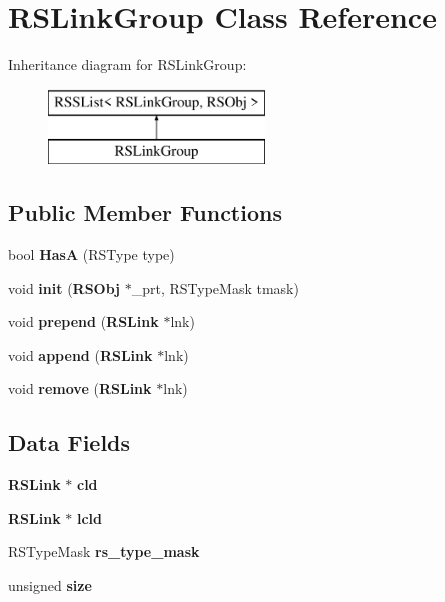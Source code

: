 \section{R\-S\-Link\-Group Class Reference}
\label{classRSLinkGroup}
Inheritance diagram for R\-S\-Link\-Group\-:\begin{figure}[H]
\begin{center}
\leavevmode
\includegraphics[height=2.000000cm]{classRSLinkGroup}
\end{center}
\end{figure}
\subsection*{Public Member Functions}
\begin{DoxyCompactItemize}
\item 
bool {\bfseries Has\-A} (R\-S\-Type type)\label{classRSLinkGroup_a09ff23048e50a78269a5afef1023c805}

\item 
void {\bfseries init} ({\bf R\-S\-Obj} $\ast$\-\_\-prt, R\-S\-Type\-Mask tmask)\label{classRSLinkGroup_a3e8eeabe31cc2c627108ae6b063a0974}

\item 
void {\bfseries prepend} ({\bf R\-S\-Link} $\ast$lnk)\label{classRSLinkGroup_aa1d93e58ef28b1c8362d2ff7b1b646a0}

\item 
void {\bfseries append} ({\bf R\-S\-Link} $\ast$lnk)\label{classRSLinkGroup_ae288366c6b97a2e4324cddb78cdaaa0b}

\item 
void {\bfseries remove} ({\bf R\-S\-Link} $\ast$lnk)\label{classRSLinkGroup_a57fcbdedd72e75aa589e64063d2c764a}

\end{DoxyCompactItemize}
\subsection*{Data Fields}
\begin{DoxyCompactItemize}
\item 
{\bf R\-S\-Link} $\ast$ {\bfseries cld}\label{classRSLinkGroup_a2687c9fa2cbac82c52e3dfa30d7db47e}

\item 
{\bf R\-S\-Link} $\ast$ {\bfseries lcld}\label{classRSLinkGroup_a7ee22bc3581cc2dca827dd0138ea2afe}

\item 
R\-S\-Type\-Mask {\bfseries rs\-\_\-type\-\_\-mask}\label{classRSLinkGroup_af9c1848c92c27146984d97ea8a043f19}

\item 
unsigned {\bfseries size}\label{classRSLinkGroup_ad6d4ee713bb4544b5e582cde75fb14d5}

\end{DoxyCompactItemize}


